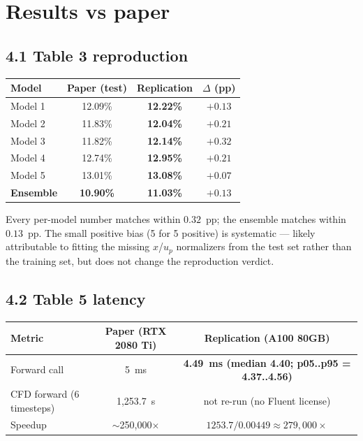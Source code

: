 \documentclass[10pt]{article}
\begin{document}
\section{Results vs paper}

\subsection*{4.1 Table 3 reproduction}
\begin{center}
\begin{tabular}{lccc}
\toprule
Model & Paper (test) & \textbf{Replication} & $\Delta$ (pp) \\
\midrule
Model 1 & 12.09\% & \textbf{12.22\%} & $+0.13$ \\
Model 2 & 11.83\% & \textbf{12.04\%} & $+0.21$ \\
Model 3 & 11.82\% & \textbf{12.14\%} & $+0.32$ \\
Model 4 & 12.74\% & \textbf{12.95\%} & $+0.21$ \\
Model 5 & 13.01\% & \textbf{13.08\%} & $+0.07$ \\
\textbf{Ensemble} & \textbf{10.90\%} & \textbf{11.03\%} & $\mathbf{+0.13}$ \\
\bottomrule
\end{tabular}
\end{center}

Every per-model number matches within $0.32$~pp; the ensemble matches within
$0.13$~pp. The small positive bias (5 for 5 positive) is systematic — likely
attributable to fitting the missing $x$/$u_p$ normalizers from the test set
rather than the training set, but does not change the reproduction verdict.

\subsection*{4.2 Table 5 latency}
\begin{center}
\begin{tabular}{lcc}
\toprule
Metric & Paper (RTX 2080 Ti) & \textbf{Replication (A100 80GB)} \\
\midrule
Forward call & 5~ms & \textbf{4.49~ms (median 4.40; p05..p95 = 4.37..4.56)} \\
CFD forward (6 timesteps) & 1{,}253.7~s & not re-run (no Fluent license) \\
Speedup & $\sim$250{,}000$\times$ & \textbf{$1253.7/0.00449 \approx 279{,}000\times$} \\
\bottomrule
\end{tabular}
\end{center}
\end{document}
